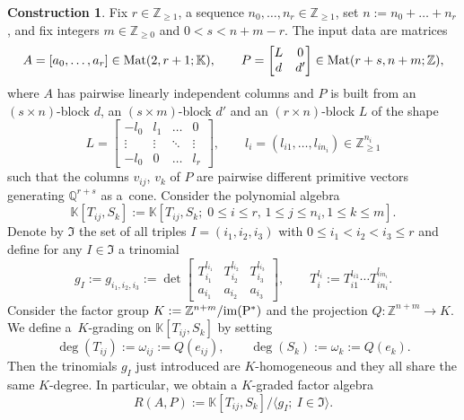 \documentclass[pdftex]{sigma}%
\theoremstyle{definition}
\newtheorem{construction}[thm]{Construction}
\def\KK{{\mathbb K}}
\def\ZZ{{\mathbb Z}}
\def\QQ{{\mathbb Q}}
\def\Mat{{\rm Mat}}
\def\bangle#1{{\langle #1 \rangle}}
\numberwithin{equation}{section}
\begin{document}
\begin{construction}
\label{constr:RAP}
Fix $r \in \ZZ_{\ge 1}$, a sequence
$n_0, \dots, n_r \in \ZZ_{\ge 1}$, set
$n := n_0 + \dots + n_r$, and fix
integers $m \in \ZZ_{\ge 0}$ and $0 < s < n+m-r$.
The input data are matrices
\[
A =[a_0, \dots, a_r] \in\Mat(2,r+1;\KK),\qquad
P =\begin{bmatrix}
L & 0
\\
d & d'
\end{bmatrix}
 \in
\Mat(r+s,n+m; \ZZ),
\]
where $A$ has pairwise linearly independent
columns and $P$ is built from an
$(s \times n)$-block $d$, an $(s \times m)$-block
$d'$ and an $(r \times n)$-block $L$
of the shape
\[
L = \begin{bmatrix}
-l_0 & l_1 & \dots & 0
\\
\vdots & \vdots & \ddots & \vdots
\\
-l_0 & 0 &\dots & l_{r}
\end{bmatrix}\!,\qquad
l_i = (l_{i1}, \dots, l_{in_i}) \in \ZZ_{\ge 1}^{n_i}
\]
such that the columns $v_{ij}$, $v_k$ of
$P$ are pairwise different primitive vectors
generating $\QQ^{r+s}$ as a~cone.
Consider the polynomial algebra
\[
\KK[T_{ij},S_k] :=
\KK[T_{ij},S_k; \; 0 \le i \le r, \, 1 \le j \le n_i, 1 \le k \le m].
\]
Denote by $\mathfrak{I}$ the set of
all triples $I = (i_1,i_2,i_3)$ with
$0 \le i_1 < i_2 < i_3 \le r$
and define for any $I \in \mathfrak{I}$
a trinomial
\[
g_I := g_{i_1,i_2,i_3} := \det
\begin{bmatrix}
T_{i_1}^{l_{i_1}} & T_{i_2}^{l_{i_2}} & T_{i_3}^{l_{i_3}}
\\
a_{i_1} & a_{i_2} & a_{i_3}
\end{bmatrix}\!,\qquad
T_i^{l_i} := T_{i1}^{l_{i1}} \cdots T_{in_i}^{l_{in_i}}.
\]
Consider the factor group
$K := \ZZ^{n+m}/\rm{im}(P^*)$
and the projection $Q \colon \ZZ^{n+m} \to K$.
We define a~$K$-grading on
$\KK[T_{ij},S_k]$ by setting
\[
\deg(T_{ij}) :=\omega_{ij} :=Q(e_{ij}),\qquad
\deg(S_{k}) :=\omega_k :=Q(e_{k}).
\]
Then the trinomials $g_I$ just introduced
are $K$-homogeneous and they all share the
same $K$-degree.
In particular, we obtain a $K$-graded factor
algebra
\[
R(A,P) :=\KK[T_{ij},S_k] / \bangle{g_I; \ I \in \mathfrak{I}}.
\]
\end{construction}
\end{document}
